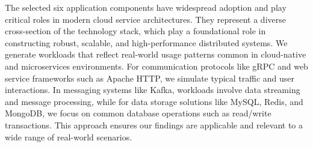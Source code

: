 The selected six application components have widespread adoption and play critical roles in modern cloud service architectures.
They represent a diverse cross-section of the technology stack, which play a foundational role in constructing robust, scalable, and high-performance distributed systems.
We generate workloads that reflect real-world usage patterns common in cloud-native and microservices environments.
For communication protocols like gRPC and web service frameworks such as Apache HTTP, we simulate typical traffic and user interactions.
In messaging systems like Kafka, workloads involve data streaming and message processing, while for data storage solutions like MySQL, Redis, and MongoDB, we focus on common database operations such as read/write transactions.
This approach ensures our findings are applicable and relevant to a wide range of real-world scenarios.




